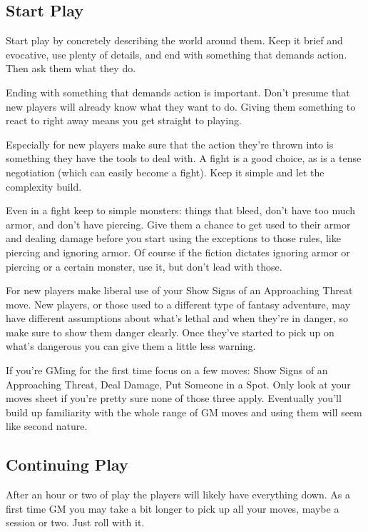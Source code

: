 \subsection{Start Play}


 Start play by concretely describing the world around them. Keep it brief and evocative, use plenty of details, and end with something that demands action. Then ask them what they do.


 Ending with something that demands action is important. Don't presume that new players will already know what they want to do. Giving them something to react to right away means you get straight to playing.


 Especially for new players make sure that the action they're thrown into is something they have the tools to deal with. A fight is a good choice, as is a tense negotiation (which can easily become a fight). Keep it simple and let the complexity build.


 Even in a fight keep to simple monsters: things that bleed, don't have too much armor, and don't have piercing. Give them a chance to get used to their armor and dealing damage before you start using the exceptions to those rules, like piercing and ignoring armor. Of course if the fiction dictates ignoring armor or piercing or a certain monster, use it, but don't lead with those.


 For new players make liberal use of your Show Signs of an Approaching Threat move. New players, or those used to a different type of fantasy adventure, may have different assumptions about what's lethal and when they're in danger, so make sure to show them danger clearly. Once they've started to pick up on what's dangerous you can give them a little less warning.


 If you're GMing for the first time focus on a few moves: Show Signs of an Approaching Threat, Deal Damage, Put Someone in a Spot. Only look at your moves sheet if you're pretty sure none of those three apply. Eventually you'll build up familiarity with the whole range of GM moves and using them will seem like second nature.
\subsection{Continuing Play}


 After an hour or two of play the players will likely have everything down. As a first time GM you may take a bit longer to pick up all your moves, maybe a session or two. Just roll with it.


